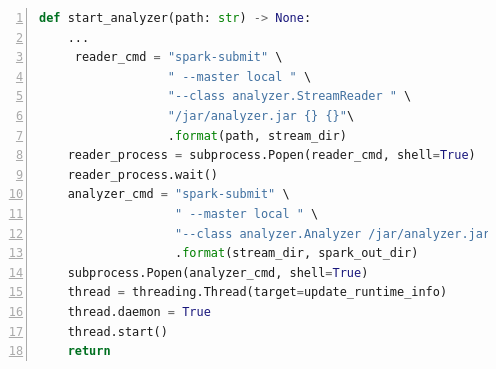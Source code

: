 \begin{lstlisting}[label=list:sp-exec-local-use,caption=Use of LocalExecutor for SimBaD-CLI step, basicstyle=\footnotesize\ttfamily, language=python, numbers=left]
def start_analyzer(path: str) -> None:
    ...
     reader_cmd = "spark-submit" \
                  " --master local " \
                  "--class analyzer.StreamReader " \
                  "/jar/analyzer.jar {} {}"\
                  .format(path, stream_dir)
    reader_process = subprocess.Popen(reader_cmd, shell=True)
    reader_process.wait()
    analyzer_cmd = "spark-submit" \
                   " --master local " \
                   "--class analyzer.Analyzer /jar/analyzer.jar {} {}"\
                   .format(stream_dir, spark_out_dir)
    subprocess.Popen(analyzer_cmd, shell=True)
    thread = threading.Thread(target=update_runtime_info)
    thread.daemon = True
    thread.start()
    return
\end{lstlisting}
